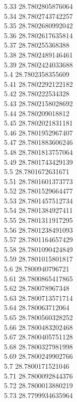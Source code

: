 {5.33	28.7802805876064\\
5.34	28.7802743742257\\
5.35	28.7802680992042\\
5.36	28.7802617635814\\
5.37	28.780255368388\\
5.38	28.7802489146461\\
5.39	28.7802424033688\\
5.4	28.7802358355609\\
5.41	28.7802292122182\\
5.42	28.780222534328\\
5.43	28.7802158028692\\
5.44	28.780209018812\\
5.45	28.7802021831181\\
5.46	28.7801952967407\\
5.47	28.7801883606246\\
5.48	28.7801813757064\\
5.49	28.7801743429139\\
5.5	28.7801672631671\\
5.51	28.7801601373773\\
5.52	28.7801529664477\\
5.53	28.7801457512734\\
5.54	28.7801384927411\\
5.55	28.7801311917295\\
5.56	28.7801238491093\\
5.57	28.7801164657429\\
5.58	28.7801090424849\\
5.59	28.7801015801817\\
5.6	28.7800940796721\\
5.61	28.7800865417865\\
5.62	28.780078967348\\
5.63	28.7800713571714\\
5.64	28.780063712064\\
5.65	28.7800560328252\\
5.66	28.7800483202468\\
5.67	28.7800405751128\\
5.68	28.7800327981998\\
5.69	28.7800249902766\\
5.7	28.7800171521046\\
5.71	28.7800092844376\\
5.72	28.7800013880219\\
5.73	28.7799934635964\\
}
